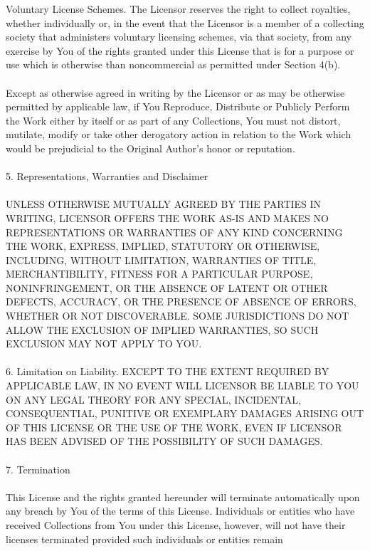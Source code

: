         Voluntary License Schemes. The Licensor reserves the right to collect
        royalties, whether individually or, in the event that the Licensor is a
        member of a collecting society that administers voluntary licensing
        schemes, via that society, from any exercise by You of the rights
        granted under this License that is for a purpose or use which is
        otherwise than noncommercial as permitted under Section 4(b).
        \\ \\
    Except as otherwise agreed in writing by the Licensor or as may be otherwise
    permitted by applicable law, if You Reproduce, Distribute or Publicly
    Perform the Work either by itself or as part of any Collections, You must
    not distort, mutilate, modify or take other derogatory action in relation to
    the Work which would be prejudicial to the Original Author's honor or
    reputation.
\\ \\
5. Representations, Warranties and Disclaimer \\ \\
UNLESS OTHERWISE MUTUALLY AGREED BY THE PARTIES IN WRITING, LICENSOR OFFERS THE
WORK AS-IS AND MAKES NO REPRESENTATIONS OR WARRANTIES OF ANY KIND CONCERNING THE
WORK, EXPRESS, IMPLIED, STATUTORY OR OTHERWISE, INCLUDING, WITHOUT LIMITATION,
WARRANTIES OF TITLE, MERCHANTIBILITY, FITNESS FOR A PARTICULAR PURPOSE,
NONINFRINGEMENT, OR THE ABSENCE OF LATENT OR OTHER DEFECTS, ACCURACY, OR THE
PRESENCE OF ABSENCE OF ERRORS, WHETHER OR NOT DISCOVERABLE. SOME JURISDICTIONS
DO NOT ALLOW THE EXCLUSION OF IMPLIED WARRANTIES, SO SUCH EXCLUSION MAY NOT
APPLY TO YOU.
\\ \\
6. Limitation on Liability. EXCEPT TO THE EXTENT REQUIRED BY APPLICABLE LAW, IN
NO EVENT WILL LICENSOR BE LIABLE TO YOU ON ANY LEGAL THEORY FOR ANY SPECIAL,
INCIDENTAL, CONSEQUENTIAL, PUNITIVE OR EXEMPLARY DAMAGES ARISING OUT OF THIS
LICENSE OR THE USE OF THE WORK, EVEN IF LICENSOR HAS BEEN ADVISED OF THE
POSSIBILITY OF SUCH DAMAGES.
\\ \\
7. Termination \\ \\
    This License and the rights granted hereunder will terminate automatically
    upon any breach by You of the terms of this License. Individuals or entities
    who have received Collections from You under this License, however, will not
    have their licenses terminated provided such individuals or entities remain
